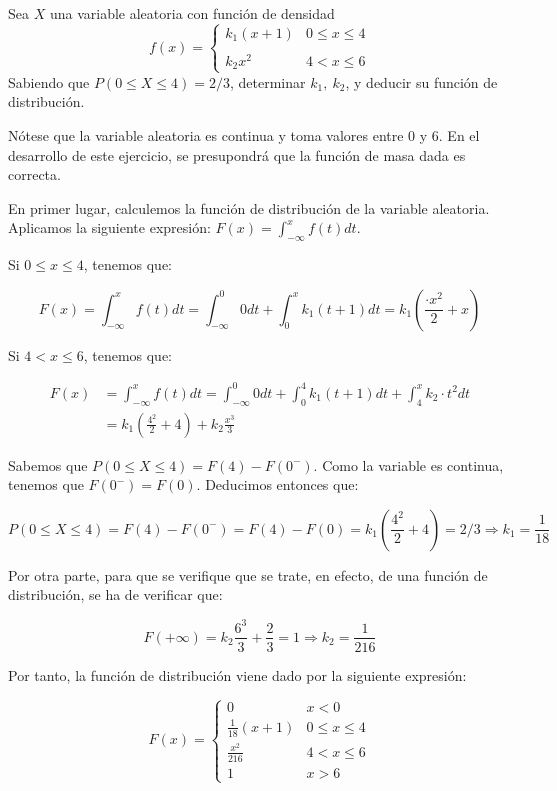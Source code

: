 \problem
Sea $X$ una variable aleatoria con funci{\'o}n de densidad
$$
f(x) = \left \{
\begin{array}{lc}
k_{1} (x+1) & 0 \leq x \leq 4 \\
\\ k_{2} x^{2} & 4 <x \leq 6
\end{array}
\right.
$$
Sabiendo que  $P(0 \leq X \leq 4) = 2/3$,  determinar $k_{1},\ k_{2}$, y
deducir su funci{\'o}n de distribuci{\'o}n.

Nótese que la variable aleatoria es continua y toma valores entre 0 y 6. En el desarrollo de este ejercicio, se presupondrá que la función de masa dada es correcta. 

En primer lugar, calculemos la función de distribución de la variable aleatoria. Aplicamos la siguiente expresión: $F(x) = \int_{-\infty}^x f(t) dt$. 

Si $0 \leq x \leq 4$, tenemos que: 

$$F(x) = \int_{-\infty}^x f(t) dt = \int_{-\infty}^0 0 dt + \int_0^x k_1(t+1)dt = k_1(\frac{·x^2}{2} + x)$$ 

Si $4 < x \leq 6$, tenemos que:

\begin{equation*}
\begin{split}
F(x) & = \int_{-\infty}^x f(t) dt = \int_{-\infty}^0 0 dt + \int_0^4 k_1(t+1)dt + \int_4^x k_2·t^2 dt \\
& = k_1(\frac{4^2}{2} + 4) + k_2\frac{x^3}{3} 
\end{split}
\end{equation*}

Sabemos que $P(0\leq X \leq 4) = F(4) - F(0^-)$. Como la variable es continua, tenemos que $F(0^-) = F(0)$. Deducimos entonces que: 

$$P(0 \leq X \leq 4) = F(4) - F(0^-) = F(4) - F(0) = k_1(\frac{4^2}{2} + 4) = 2/3 \Rightarrow k_1 = \frac{1}{18}$$

Por otra parte, para que se verifique que se trate, en efecto, de una función de distribución, se ha de verificar que: 

$$F(+\infty) = k_2\frac{6^3}{3} + \frac{2}{3} = 1 \Rightarrow k_2 = \frac{1}{216}$$

Por tanto, la función de distribución viene dado por la siguiente expresión: 

\begin{equation*}
	F(x) = \left \{
	\begin{array}{lcc}
	0 & x < 0 \\
	\frac{1}{18} (x+1) & 0 \leq x \leq 4 \\
	\frac{x^{2}}{216} & 4 <x \leq 6 \\
	1 & x > 6
	\end{array}
	\right.
\end{equation*}
